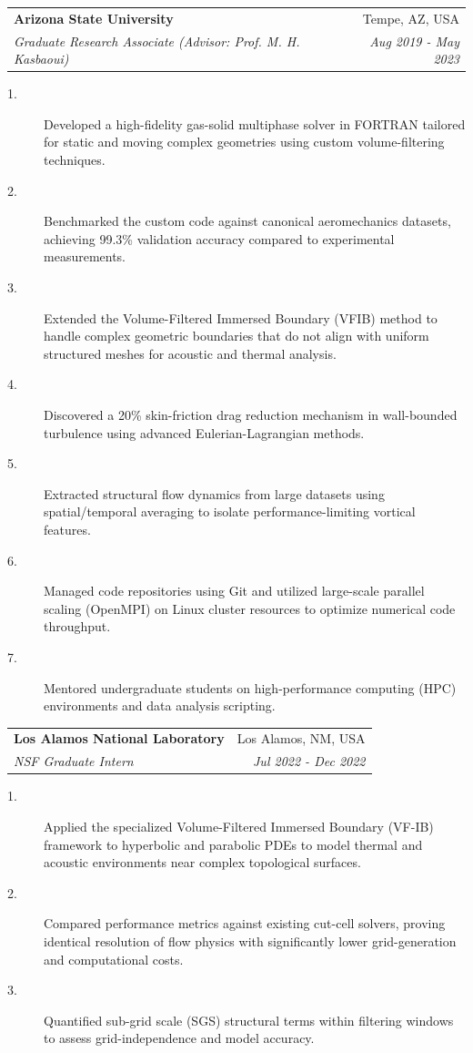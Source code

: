 \documentclass[letterpaper,10.8pt]{article}
\makeatletter
\newcommand{\resumeSubheading}[4]{
  \vspace{-1pt}\item
    \begin{tabular*}{0.97\textwidth}{l@{\extracolsep{\fill}}r}
      \textbf{#1} & #2 \\
      \textit{\small#3} & \textit{\small #4} \\
    \end{tabular*}\vspace{-5pt}
}
\makeatother
\begin{document}
     \resumeSubheading   
    {Arizona State University}{Tempe, AZ, USA}
    {Graduate Research Associate (Advisor: Prof. M. H. Kasbaoui)}{Aug 2019 - May 2023}
        \begin{description}
        \item[1.] Developed a high-fidelity gas-solid multiphase solver in FORTRAN tailored for static and moving complex geometries using custom volume-filtering techniques.
        \item[2.] Benchmarked the custom code against canonical aeromechanics datasets, achieving 99.3\% validation accuracy compared to experimental measurements.
        \item[3.] Extended the Volume-Filtered Immersed Boundary (VFIB) method to handle complex geometric boundaries that do not align with uniform structured meshes for acoustic and thermal analysis.
        \item[4.] Discovered a 20\% skin-friction drag reduction mechanism in wall-bounded turbulence using advanced Eulerian-Lagrangian methods.
        \item[5.] Extracted structural flow dynamics from large datasets using spatial/temporal averaging to isolate performance-limiting vortical features.
        \item[6.] Managed code repositories using Git and utilized large-scale parallel scaling (OpenMPI) on Linux cluster resources to optimize numerical code throughput.
        \item[7.] Mentored undergraduate students on high-performance computing (HPC) environments and data analysis scripting.
        \end{description}
    \resumeSubheading
    {Los Alamos National Laboratory}{Los Alamos, NM, USA}
    {NSF Graduate Intern}{Jul 2022 - Dec 2022}
        \begin{description}
        \item[1.] Applied the specialized Volume-Filtered Immersed Boundary (VF-IB) framework to hyperbolic and parabolic PDEs to model thermal and acoustic environments near complex topological surfaces.
        \item[2.] Compared performance metrics against existing cut-cell solvers, proving identical resolution of flow physics with significantly lower grid-generation and computational costs.
        \item[3.] Quantified sub-grid scale (SGS) structural terms within filtering windows to assess grid-independence and model accuracy. 
        \end{description}
\end{document}
